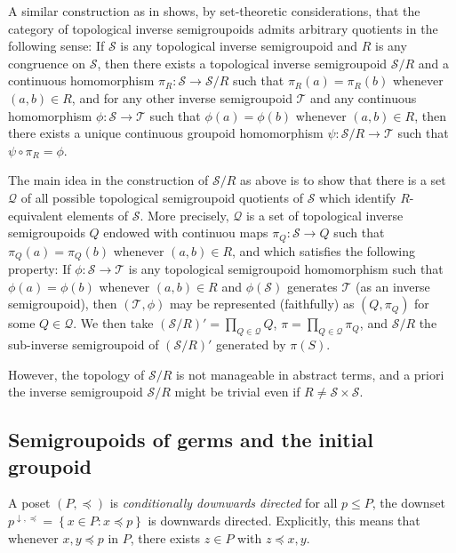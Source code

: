 \begin{remark}
A similar construction as in \cite{MR0412333} shows, by set-theoretic considerations, that the category of topological inverse semigroupoids admits arbitrary quotients in the following sense: If $\mathcal{S}$ is any topological inverse semigroupoid and $R$ is any congruence on $\mathcal{S}$, then there exists a topological inverse semigroupoid $\mathcal{S}/R$ and a continuous homomorphism $\pi_R\colon\mathcal{S}\to\mathcal{S}/R$ such that $\pi_R(a)=\pi_R(b)$ whenever $(a,b)\in R$, and for any other inverse semigroupoid $\mathcal{T}$ and any continuous homomorphism $\phi\colon\mathcal{S}\to\mathcal{T}$ such that $\phi(a)=\phi(b)$ whenever $(a,b)\in R$, then there exists a unique continuous groupoid homomorphism $\psi\colon\mathcal{S}/R\to\mathcal{T}$ such that $\psi\circ\pi_R=\phi$.

The main idea in the construction of $\mathcal{S}/R$ as above is to show that there is a set $\mathscr{Q}$ of all possible topological semigroupoid quotients of $\mathcal{S}$ which identify $R$-equivalent elements of $\mathcal{S}$. More precisely, $\mathscr{Q}$ is a set of topological inverse semigroupoids $Q$ endowed with continuou maps $\pi_Q\colon\mathcal{S}\to Q$ such that $\pi_Q(a)=\pi_Q(b)$ whenever $(a,b)\in R$, and which satisfies the following property: If $\phi\colon\mathcal{S}\to\mathcal{T}$ is any topological semigroupoid homomorphism such that $\phi(a)=\phi(b)$ whenever $(a,b)\in R$ and $\phi(\mathcal{S})$ generates $\mathcal{T}$ (as an inverse semigroupoid), then $(\mathcal{T},\phi)$ may be represented (faithfully) as $(Q,\pi_Q)$ for some $Q\in\mathscr{Q}$. We then take $(\mathcal{S}/R)'=\prod_{Q\in\mathscr{Q}}Q$, $\pi=\prod_{Q\in\mathscr{Q}}\pi_Q$, and $\mathcal{S}/R$ the sub-inverse semigroupoid of $(\mathcal{S}/R)'$ generated by $\pi(S)$.

However, the topology of $\mathcal{S}/R$ is not manageable in abstract terms, and a priori the inverse semigroupoid $\mathcal{S}/R$ might be trivial even if $R\neq\mathcal{S}\times\mathcal{S}$.
\end{remark}

\subsection{Semigroupoids of germs and the initial groupoid}\label{subsec:groupoidofgerms}

\begin{definition}
A poset $(P,\preceq)$ is \emph{conditionally downwards directed} for all $p\leq P$, the downset $p^{\downarrow,\preceq}=\left\{x\in P:x\preceq p\right\}$ is downwards directed. Explicitly, this means that whenever $x,y\preceq p$ in $P$, there exists $z\in P$ with $z\preceq x,y$.
\end{definition}


